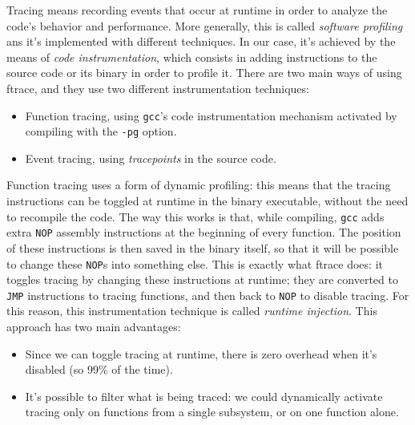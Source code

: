 \documentclass[10pt]{book}
\begin{document}
Tracing means recording events that occur at runtime in order to analyze the code's behavior and performance. More generally, this is called \textit{software profiling} ans it's implemented with different techniques. In our case, it's achieved by the means of \textit{code instrumentation}, which consists in adding instructions to the source code or its binary in order to profile it. There are two main ways of using ftrace, and they use two different instrumentation techniques:
\begin{itemize}
    \item Function tracing, using \verb|gcc|'s code instrumentation mechanism activated by compiling with the \verb|-pg| option.
    \item Event tracing, using \textit{tracepoints} in the source code.
\end{itemize}
Function tracing uses a form of dynamic profiling: this means that the tracing instructions can be toggled at runtime in the binary executable, without the need to recompile the code. The way this works is that, while compiling, \verb|gcc| adds extra \verb|NOP| assembly instructions at the beginning of every function. The position of these instructions is then saved in the binary itself, so that it will be possible to change these \verb|NOP|s into something else. This is exactly what ftrace does: it toggles tracing by changing these instructions at runtime; they are converted to \verb|JMP| instructions to tracing functions, and then back to \verb|NOP| to disable tracing. For this reason, this instrumentation technique is called \textit{runtime injection}. This approach has two main advantages: 
\begin{itemize}
    \item Since we can toggle tracing at runtime, there is zero overhead when it's disabled (so 99\% of the time).
    \item It's possible to filter what is being traced: we could dynamically activate tracing only on functions from a single subsystem, or on one function alone.
\end{itemize}
\end{document}
